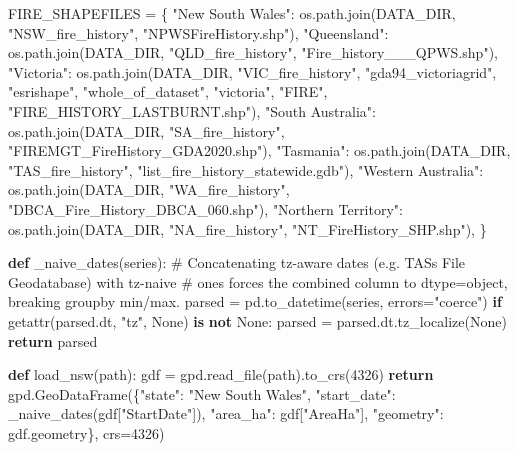 \documentclass[
  letterpaper,
  DIV=11,
  numbers=noendperiod]{scrartcl}
\newenvironment{Shaded}{\begin{snugshade}}{\end{snugshade}}
\newcommand{\BuiltInTok}[1]{\textcolor[rgb]{0.00,0.23,0.31}{#1}}
\newcommand{\CommentTok}[1]{\textcolor[rgb]{0.37,0.37,0.37}{#1}}
\newcommand{\ControlFlowTok}[1]{\textcolor[rgb]{0.00,0.23,0.31}{\textbf{#1}}}
\newcommand{\DecValTok}[1]{\textcolor[rgb]{0.68,0.00,0.00}{#1}}
\newcommand{\KeywordTok}[1]{\textcolor[rgb]{0.00,0.23,0.31}{\textbf{#1}}}
\newcommand{\NormalTok}[1]{\textcolor[rgb]{0.00,0.23,0.31}{#1}}
\newcommand{\OperatorTok}[1]{\textcolor[rgb]{0.37,0.37,0.37}{#1}}
\newcommand{\StringTok}[1]{\textcolor[rgb]{0.13,0.47,0.30}{#1}}
\newcommand{\VariableTok}[1]{\textcolor[rgb]{0.07,0.07,0.07}{#1}}
\begin{document}
\begin{Shaded}
\begin{Highlighting}[]
\NormalTok{FIRE\_SHAPEFILES }\OperatorTok{=}\NormalTok{ \{}
    \StringTok{"New South Wales"}\NormalTok{: os.path.join(DATA\_DIR, }\StringTok{"NSW\_fire\_history"}\NormalTok{, }\StringTok{"NPWSFireHistory.shp"}\NormalTok{),}
    \StringTok{"Queensland"}\NormalTok{: os.path.join(DATA\_DIR, }\StringTok{"QLD\_fire\_history"}\NormalTok{, }\StringTok{"Fire\_history\_\_\_QPWS.shp"}\NormalTok{),}
    \StringTok{"Victoria"}\NormalTok{: os.path.join(DATA\_DIR, }\StringTok{"VIC\_fire\_history"}\NormalTok{, }\StringTok{"gda94\_victoriagrid"}\NormalTok{, }\StringTok{"esrishape"}\NormalTok{,}
                              \StringTok{"whole\_of\_dataset"}\NormalTok{, }\StringTok{"victoria"}\NormalTok{, }\StringTok{"FIRE"}\NormalTok{, }\StringTok{"FIRE\_HISTORY\_LASTBURNT.shp"}\NormalTok{),}
    \StringTok{"South Australia"}\NormalTok{: os.path.join(DATA\_DIR, }\StringTok{"SA\_fire\_history"}\NormalTok{, }\StringTok{"FIREMGT\_FireHistory\_GDA2020.shp"}\NormalTok{),}
    \StringTok{"Tasmania"}\NormalTok{: os.path.join(DATA\_DIR, }\StringTok{"TAS\_fire\_history"}\NormalTok{, }\StringTok{"list\_fire\_history\_statewide.gdb"}\NormalTok{),}
    \StringTok{"Western Australia"}\NormalTok{: os.path.join(DATA\_DIR, }\StringTok{"WA\_fire\_history"}\NormalTok{, }\StringTok{"DBCA\_Fire\_History\_DBCA\_060.shp"}\NormalTok{),}
    \StringTok{"Northern Territory"}\NormalTok{: os.path.join(DATA\_DIR, }\StringTok{"NA\_fire\_history"}\NormalTok{, }\StringTok{"NT\_FireHistory\_SHP.shp"}\NormalTok{),}
\NormalTok{\}}

\KeywordTok{def}\NormalTok{ \_naive\_dates(series):}
    \CommentTok{\# Concatenating tz{-}aware dates (e.g. TAS\textquotesingle{}s File Geodatabase) with tz{-}naive}
    \CommentTok{\# ones forces the combined column to dtype=object, breaking groupby min/max.}
\NormalTok{    parsed }\OperatorTok{=}\NormalTok{ pd.to\_datetime(series, errors}\OperatorTok{=}\StringTok{"coerce"}\NormalTok{)}
    \ControlFlowTok{if} \BuiltInTok{getattr}\NormalTok{(parsed.dt, }\StringTok{"tz"}\NormalTok{, }\VariableTok{None}\NormalTok{) }\KeywordTok{is} \KeywordTok{not} \VariableTok{None}\NormalTok{:}
\NormalTok{        parsed }\OperatorTok{=}\NormalTok{ parsed.dt.tz\_localize(}\VariableTok{None}\NormalTok{)}
    \ControlFlowTok{return}\NormalTok{ parsed}

\KeywordTok{def}\NormalTok{ load\_nsw(path):}
\NormalTok{    gdf }\OperatorTok{=}\NormalTok{ gpd.read\_file(path).to\_crs(}\DecValTok{4326}\NormalTok{)}
    \ControlFlowTok{return}\NormalTok{ gpd.GeoDataFrame(\{}\StringTok{"state"}\NormalTok{: }\StringTok{"New South Wales"}\NormalTok{, }\StringTok{"start\_date"}\NormalTok{: \_naive\_dates(gdf[}\StringTok{"StartDate"}\NormalTok{]),}
                              \StringTok{"area\_ha"}\NormalTok{: gdf[}\StringTok{"AreaHa"}\NormalTok{], }\StringTok{"geometry"}\NormalTok{: gdf.geometry\}, crs}\OperatorTok{=}\DecValTok{4326}\NormalTok{)}


\end{Highlighting}
\end{Shaded}
\end{document}
